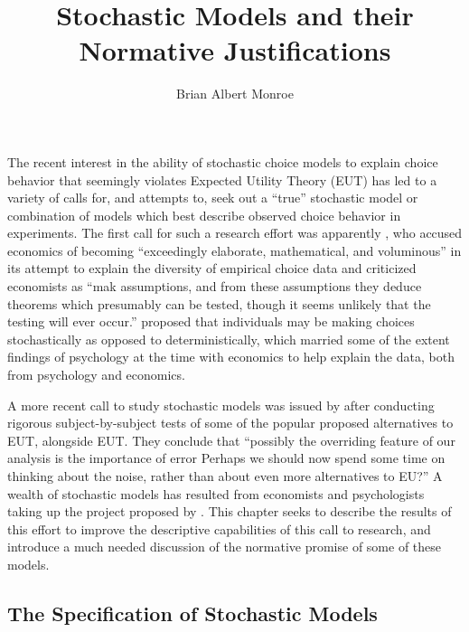 \documentclass[11pt,a4paper]{article}
\title{Stochastic Models and their Normative Justifications}
\author{Brian Albert Monroe}
\begin{document}
\maketitle

\onehalfspacing
\tableofcontents


\newpage

The recent interest in the ability of stochastic choice models to explain choice behavior that seemingly violates Expected Utility Theory (EUT) has led to a variety of calls for, and attempts to, seek out a \enquote{true} stochastic model or combination of  models which best describe observed choice behavior in experiments.
The first call for such a research effort was apparently \textcite{Edwards1954}, who accused economics of becoming \enquote{exceedingly elaborate, mathematical, and voluminous} \textcite[380]{Edwards1954} in its attempt to explain the diversity of empirical choice data and criticized economists as \enquote{mak assumptions, and from these assumptions they deduce theorems which presumably can be tested, though it seems unlikely that the testing will ever occur.}
\textcite{Edwards1954} proposed that individuals may be making choices stochastically as opposed to deterministically, which married some of the extent findings of psychology at the time with economics to help explain the data, both from psychology and economics.

A more recent call to study stochastic models was issued by \textcite[1321]{Hey1994} after conducting rigorous subject-by-subject tests of some of the popular proposed alternatives to EUT, alongside EUT.
They conclude that \enquote{possibly the overriding feature of our analysis is the importance of error \textelp{} Perhaps we should now spend some time on thinking about the noise, rather than about even more alternatives to EU?}
A wealth of stochastic models has resulted from economists and psychologists taking up the project proposed by \textcite{Hey1994}.
This chapter seeks to describe the results of this effort to improve the descriptive capabilities of this call to research, and introduce a much needed discussion of the normative promise of some of these models.

\subsection{The Specification of Stochastic Models}
\end{document}
